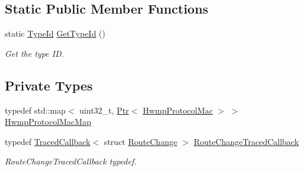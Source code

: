 \subsection*{Static Public Member Functions}
\begin{DoxyCompactItemize}
\item 
static \hyperlink{classns3_1_1TypeId}{Type\+Id} \hyperlink{classns3_1_1dot11s_1_1HwmpProtocol_a78243b5b294c6ab278cc0acae95960ac}{Get\+Type\+Id} ()
\begin{DoxyCompactList}\small\item\em Get the type ID. \end{DoxyCompactList}\end{DoxyCompactItemize}
\subsection*{Private Types}
\begin{DoxyCompactItemize}
\item 
typedef std\+::map$<$ uint32\+\_\+t, \hyperlink{classns3_1_1Ptr}{Ptr}$<$ \hyperlink{classns3_1_1dot11s_1_1HwmpProtocolMac}{Hwmp\+Protocol\+Mac} $>$ $>$ \hyperlink{classns3_1_1dot11s_1_1HwmpProtocol_affcc6c0fdecdf3c6160d356e86aeb8ed}{Hwmp\+Protocol\+Mac\+Map}
\item 
typedef \hyperlink{classns3_1_1TracedCallback}{Traced\+Callback}$<$ struct \hyperlink{structns3_1_1dot11s_1_1RouteChange}{Route\+Change} $>$ \hyperlink{classns3_1_1dot11s_1_1HwmpProtocol_a741182390b136b5eec817bc5d7e8c143}{Route\+Change\+Traced\+Callback}
\begin{DoxyCompactList}\small\item\em Route\+Change\+Traced\+Callback typedef. \end{DoxyCompactList}\end{DoxyCompactItemize}
